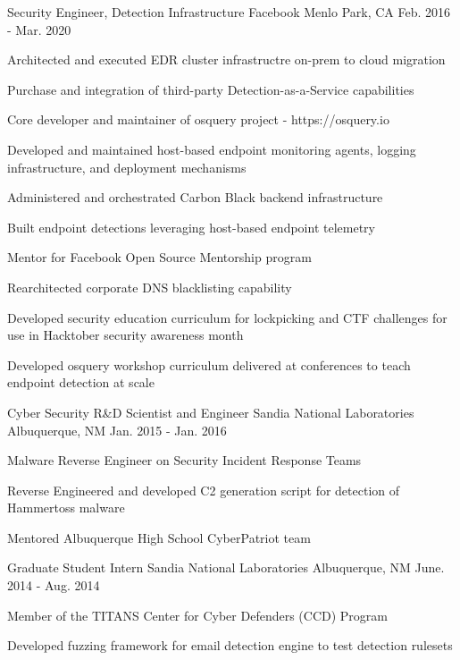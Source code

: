 \begin{cventries}
\cventry
{Security Engineer, Detection Infrastructure} %
{Facebook} %
{Menlo Park, CA} %
{Feb. 2016 - Mar. 2020} %
{ %
\begin{cvitems}
\item {Architected and executed EDR cluster infrastructre on-prem to cloud migration}
\item {Purchase and integration of third-party Detection-as-a-Service capabilities}
\item {Core developer and maintainer of osquery project - https://osquery.io}
\item {Developed and maintained host-based endpoint monitoring agents, logging infrastructure, and deployment mechanisms}
\item {Administered and orchestrated Carbon Black backend infrastructure}
\item {Built endpoint detections leveraging host-based endpoint telemetry}
\item {Mentor for Facebook Open Source Mentorship program}
\item {Rearchitected corporate DNS blacklisting capability}
\item {Developed security education curriculum for lockpicking and CTF challenges for use in Hacktober security awareness month}
\item {Developed osquery workshop curriculum delivered at conferences to teach endpoint detection at scale}
\end{cvitems}
}


\cventry
{Cyber Security R\&D Scientist and Engineer} %
{Sandia National Laboratories} %
{Albuquerque, NM} %
{Jan. 2015 - Jan. 2016} %
{ %
\begin{cvitems}
\item {Malware Reverse Engineer on Security Incident Response Teams}
\item {Reverse Engineered and developed C2 generation script for detection of Hammertoss malware}
\item {Mentored Albuquerque High School CyberPatriot team}
\end{cvitems}
}


\cventry
{Graduate Student Intern} %
{Sandia National Laboratories} %
{Albuquerque, NM} %
{June. 2014 - Aug. 2014} %
{ %
\begin{cvitems}
\item {Member of the TITANS Center for Cyber Defenders (CCD) Program}
\item {Developed fuzzing framework for email detection engine to test detection rulesets}
\end{cvitems}
}


\end{cventries}
